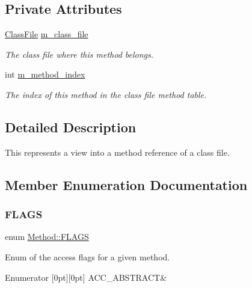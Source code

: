 \subsection*{Private Attributes}
\begin{DoxyCompactItemize}
\item 
\hyperlink{classfile_8h_a00b46b60bc40e813e9fb1bb049174346}{Class\+File} \hyperlink{classMethod_a6dddd514810b6e9230d554ceb5507a4c}{m\+\_\+class\+\_\+file}
\begin{DoxyCompactList}\small\item\em The class file where this method belongs. \end{DoxyCompactList}\item 
int \hyperlink{classMethod_a6d573fa18b21d15b361111bf03f48a74}{m\+\_\+method\+\_\+index}
\begin{DoxyCompactList}\small\item\em The index of this method in the class file method table. \end{DoxyCompactList}\end{DoxyCompactItemize}


\subsection{Detailed Description}
This represents a view into a method reference of a class file. 

\subsection{Member Enumeration Documentation}
\mbox{\label{classMethod_a142a92c7e2c79cbbedb7fd08a8a8e1ad}} 
\subsubsection{\texorpdfstring{F\+L\+A\+GS}{FLAGS}}
{\footnotesize\ttfamily enum \hyperlink{classMethod_a142a92c7e2c79cbbedb7fd08a8a8e1ad}{Method\+::\+F\+L\+A\+GS}\hspace{0.3cm}{\ttfamily [strong]}}



Enum of the access flags for a given method. 

\begin{DoxyEnumFields}{Enumerator}
[0pt][0pt]{}\mbox{\label{classMethod_a142a92c7e2c79cbbedb7fd08a8a8e1adaade04c031729a1f18ba2bb86e7aeddfc}} 
A\+C\+C\+\_\+\+A\+B\+S\+T\+R\+A\+CT&\\
\hline

\end{DoxyEnumFields}


